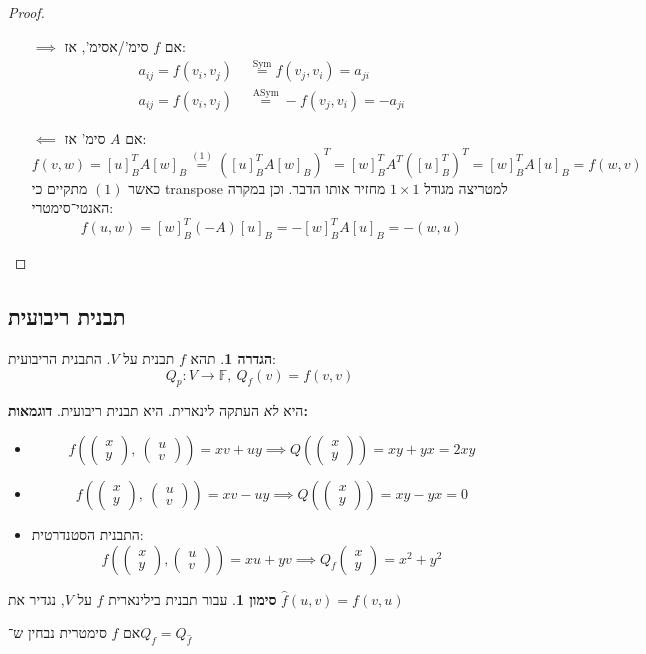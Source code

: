 \documentclass[a4paper]{article}
\newcommand\h     {\hat}
\DeclareMathOperator{\sym}     {Sym}
\DeclareMathOperator{\asym}    {ASym}
\newcommand\F         {\mathbb{F}}
\newcommand\co        {\colon}
\newcommand\pms[1]    {\begin{pmatrix}
		#1
\end{pmatrix}}
\newcommand\cl [1]    {\left ( #1 \right )}
\theoremstyle{definition}
\newtheorem{definition}{הגדרה}
\newtheorem{Notion}{סימון}
\newcommand\defi  [1] {\begin{definition}#1\end{definition}}
\newcommand\noti  [1] {\begin{Notion}#1\end{Notion}}
\begin{document}
	\begin{proof}
		\begin{itemize}
			\item[$\implies$] אם $f$ סימ'/אסימ', אז: 
			\begin{align*}
				a_{ij} = f(v_i, v_j) &\overset{\sym}{=} f(v_j, v_i) = a_{ji} \\
				a_{ij} = f(v_i, v_j) \,\,&\!\!\overset{\asym}{=} -f(v_j, v_i) = -a_{ji}
			\end{align*}
			\item[$\impliedby$] אם $A$ סימ' אז: 
			\[ f(v, w) = [u]_B^TA[w]_B \overset{(1)}{=} ([u]_B^TA[w]_B)^T = [w]_B^TA^T([u]_B^T)^T = [w]^T_BA[u]_B = f(w, v) \]
			כאשר $(1)$ מתקיים כי transpose למטריצה מגודל $1 \times 1$ מחזיר אותו הדבר. וכן במקרה האנטי־סימטרי: 
			\[ f(u, w) = [w]^T_B(-A)[u]_B = -[w]_B^TA[u]_B = -(w, u) \]
		\end{itemize}
	\end{proof}
	
	\subsection{תבנית ריבועית}
	\defi{תהא $f$ תבנית על $V$. התבנית הריבועית: 
		\[ Q_p \co V \to \F, \ Q_f(v) = f(v, v) \]}
	היא \textit{לא} העתקה לינארית. היא תבנית ריבועית. \textbf{דוגמאות: }
	\begin{itemize}
		\item 
		\[ f\cl{\pms{x \\ y}, \ \pms{u \\ v}} = xv + uy \implies Q\cl{\pms{x \\ y}} = xy + yx = 2xy \]
		\item 
		\[ f\cl{\pms{x \\ y}, \ \pms{u \\ v}} = xv - uy \implies Q\cl{\pms{x \\ y}} = xy - yx = 0 \]
		\item התבנית הסטנדרטית: 
		\[ f\cl{\pms{x \\ y}, \pms{u \\ v}} = xu + yv \implies Q_f\pms{x \\ y} = x^2 + y^2 \]
	\end{itemize}
	
	\noti{עבור תבנית בילינארית $f$ על $V$, נגדיר את $\h f(u, v) = f(v, u)$}
	אם $f$ סימטרית נבחין ש־$Q_f = Q_{\h f}$
	
\end{document}
